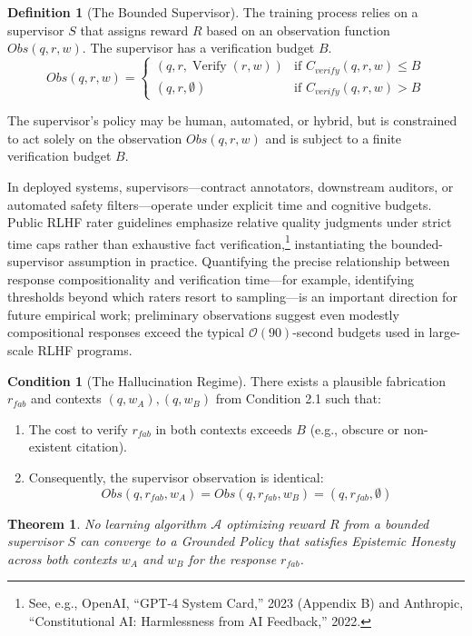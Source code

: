 \documentclass[11pt]{article}
\theoremstyle{definition}
\newtheorem{definition}{Definition}[section]
\newtheorem{condition}{Condition}[section]
\theoremstyle{plain}
\newtheorem{theorem}{Theorem}[section]
\theoremstyle{remark}
\DeclareMathOperator{\verify}{Verify}
\begin{document}
\begin{definition}[The Bounded Supervisor]
The training process relies on a supervisor $S$ that assigns reward $R$ based on an observation function $Obs(q, r, w)$. The supervisor has a verification budget $B$.
\[
Obs(q, r, w) =
\begin{cases}
(q, r, \verify(r, w)) & \text{if } C_{verify}(q, r, w) \le B \\
(q, r, \emptyset) & \text{if } C_{verify}(q, r, w) > B
\end{cases}
\]

The supervisor's policy may be human, automated, or hybrid, but is constrained to act solely on the observation $Obs(q,r,w)$ and is subject to a finite verification budget $B$.

\end{definition}

In deployed systems, supervisors---contract annotators, downstream auditors, or automated safety filters---operate under explicit time and cognitive budgets. Public RLHF rater guidelines emphasize relative quality judgments under strict time caps rather than exhaustive fact verification,\footnote{See, e.g., OpenAI, ``GPT-4 System Card,'' 2023 (Appendix B) and Anthropic, ``Constitutional AI: Harmlessness from AI Feedback,'' 2022.} instantiating the bounded-supervisor assumption in practice. Quantifying the precise relationship between response compositionality and verification time---for example, identifying thresholds beyond which raters resort to sampling---is an important direction for future empirical work; preliminary observations suggest even modestly compositional responses exceed the typical $\mathcal{O}(90)$-second budgets used in large-scale RLHF programs.

\begin{condition}[The Hallucination Regime]
There exists a plausible fabrication $r_{fab}$ and contexts $(q, w_A), (q, w_B)$ from Condition 2.1 such that:
\begin{enumerate}
    \item The cost to verify $r_{fab}$ in both contexts exceeds $B$ (e.g., obscure or non-existent citation).
    \item Consequently, the supervisor observation is identical:
    \[ Obs(q, r_{fab}, w_A) = Obs(q, r_{fab}, w_B) = (q, r_{fab}, \emptyset) \]
\end{enumerate}
\end{condition}

\begin{theorem}\label{thm:learnability}
No learning algorithm $\mathcal{A}$ optimizing reward $R$ from a bounded supervisor $S$ can converge to a Grounded Policy that satisfies Epistemic Honesty across both contexts $w_A$ and $w_B$ for the response $r_{fab}$.
\end{theorem}
\end{document}
